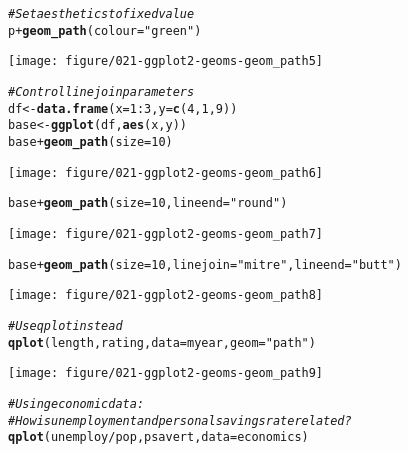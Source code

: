 \documentclass[a4paper,titlepage]{tufte-handout}\usepackage[]{graphicx}\usepackage[]{color}
\makeatletter
\def\maxwidth{ %
  \ifdim\Gin@nat@width>\linewidth
    \linewidth
  \else
    \Gin@nat@width
  \fi
}
\newcommand{\hlnum}[1]{\textcolor[rgb]{0.686,0.059,0.569}{#1}}%
\newcommand{\hlstr}[1]{\textcolor[rgb]{0.192,0.494,0.8}{#1}}%
\newcommand{\hlcom}[1]{\textcolor[rgb]{0.678,0.584,0.686}{\textit{#1}}}%
\newcommand{\hlopt}[1]{\textcolor[rgb]{0,0,0}{#1}}%
\newcommand{\hlstd}[1]{\textcolor[rgb]{0.345,0.345,0.345}{#1}}%
\newcommand{\hlkwb}[1]{\textcolor[rgb]{0.69,0.353,0.396}{#1}}%
\newcommand{\hlkwc}[1]{\textcolor[rgb]{0.333,0.667,0.333}{#1}}%
\newcommand{\hlkwd}[1]{\textcolor[rgb]{0.737,0.353,0.396}{\textbf{#1}}}%
\newenvironment{kframe}{%
 \def\at@end@of@kframe{}%
 \ifinner\ifhmode%
  \def\at@end@of@kframe{\end{minipage}}%
  \begin{minipage}{\columnwidth}%
 \fi\fi%
 \def\FrameCommand##1{\hskip\@totalleftmargin \hskip-\fboxsep
 \colorbox{shadecolor}{##1}\hskip-\fboxsep
     \hskip-\linewidth \hskip-\@totalleftmargin \hskip\columnwidth}%
 \MakeFramed {\advance\hsize-\width
   \@totalleftmargin\z@ \linewidth\hsize
   \@setminipage}}%
 {\par\unskip\endMakeFramed%
 \at@end@of@kframe}
\newenvironment{knitrout}{}{} %
\makeatother
\begin{document}
\begin{knitrout}
\begin{kframe}
\begin{alltt}
\hlcom{# Set aesthetics to fixed value}
\hlstd{p} \hlopt{+} \hlkwd{geom_path}\hlstd{(}\hlkwc{colour} \hlstd{=} \hlstr{"green"}\hlstd{)}
\end{alltt}
\end{kframe}
\texttt{[image: figure/021-ggplot2-geoms-geom\_path5]} 
\begin{kframe}\begin{alltt}
\hlcom{# Control line join parameters}
\hlstd{df} \hlkwb{<-} \hlkwd{data.frame}\hlstd{(}\hlkwc{x} \hlstd{=} \hlnum{1}\hlopt{:}\hlnum{3}\hlstd{,} \hlkwc{y} \hlstd{=} \hlkwd{c}\hlstd{(}\hlnum{4}\hlstd{,} \hlnum{1}\hlstd{,} \hlnum{9}\hlstd{))}
\hlstd{base} \hlkwb{<-} \hlkwd{ggplot}\hlstd{(df,} \hlkwd{aes}\hlstd{(x, y))}
\hlstd{base} \hlopt{+} \hlkwd{geom_path}\hlstd{(}\hlkwc{size} \hlstd{=} \hlnum{10}\hlstd{)}
\end{alltt}
\end{kframe}
\texttt{[image: figure/021-ggplot2-geoms-geom\_path6]} 
\begin{kframe}\begin{alltt}
\hlstd{base} \hlopt{+} \hlkwd{geom_path}\hlstd{(}\hlkwc{size} \hlstd{=} \hlnum{10}\hlstd{,} \hlkwc{lineend} \hlstd{=} \hlstr{"round"}\hlstd{)}
\end{alltt}
\end{kframe}
\texttt{[image: figure/021-ggplot2-geoms-geom\_path7]} 
\begin{kframe}\begin{alltt}
\hlstd{base} \hlopt{+} \hlkwd{geom_path}\hlstd{(}\hlkwc{size} \hlstd{=} \hlnum{10}\hlstd{,} \hlkwc{linejoin} \hlstd{=} \hlstr{"mitre"}\hlstd{,} \hlkwc{lineend} \hlstd{=} \hlstr{"butt"}\hlstd{)}
\end{alltt}
\end{kframe}
\texttt{[image: figure/021-ggplot2-geoms-geom\_path8]} 
\begin{kframe}\begin{alltt}
\hlcom{# Use qplot instead}
\hlkwd{qplot}\hlstd{(length, rating,} \hlkwc{data}\hlstd{=myear,} \hlkwc{geom}\hlstd{=}\hlstr{"path"}\hlstd{)}
\end{alltt}
\end{kframe}
\texttt{[image: figure/021-ggplot2-geoms-geom\_path9]} 
\begin{kframe}\begin{alltt}
\hlcom{# Using economic data:}
\hlcom{# How is unemployment and personal savings rate related?}
\hlkwd{qplot}\hlstd{(unemploy}\hlopt{/}\hlstd{pop, psavert,} \hlkwc{data}\hlstd{=economics)}

\end{alltt}
\end{kframe}
\end{knitrout}
\end{document}

